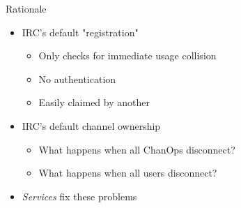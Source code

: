 \documentclass{beamer}
\begin{document}
\begin{frame}{Rationale}
\begin{itemize}
	\item IRC's default "registration"
	\begin{itemize}
		\item Only checks for immediate usage collision
		\item No authentication
		\item Easily claimed by another
	\end{itemize}
	\item IRC's default channel ownership
	\begin{itemize}
		\item What happens when all ChanOps disconnect?
		\item What happens when all users disconnect?
	\end{itemize}
	\item \emph{Services} fix these problems
\end{itemize}
\end{frame}
\end{document}
